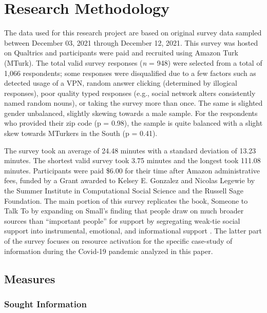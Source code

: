 \hypertarget{research-methodology}{%
\section{Research Methodology}\label{research-methodology}}

The data used for this research project are based on original survey data
sampled between December 03, 2021 through
December 12, 2021. This survey was hosted on Qualtrics and
participants were paid and recruited using Amazon Turk (MTurk). The total valid
survey responses (\emph{n} = 948) were selected from a total of 1,066
respondents; some responses were disqualified due to a few factors such as
detected usage of a VPN, random answer clicking (determined by illogical
responses), poor quality typed responses (e.g., social network alters
consistently named random nouns), or taking the survey more than once. The same
is slighted gender unbalanced, slightly skewing towards a male sample. For the
respondents who provided their zip code (p = 0.98), the sample is quite balanced with a slight skew towards MTurkers in the South (p = 0.41).

The survey took an average of 24.48 minutes with a standard deviation of 13.23 minutes. The shortest valid survey took 3.75 minutes and the longest took 111.08 minutes. Participants were paid \$6.00 for their time after Amazon administrative fees, funded by a Grant awarded to Kelsey E. Gonzalez and Nicolas Legewie by the Summer Institute in Computational Social
Science and the Russell Sage Foundation. The main portion of this survey replicates the book, Someone to Talk To \citep{smallSomeoneTalk2017} by expanding on Small's finding that people draw on much broader sources than ``important people'' for support by segregating weak-tie social support into instrumental, emotional, and informational support \citep[see][]{houseStructuresProcessesSocial1988}. The latter
part of the survey focuses on resource activation for the specific case-study of
information during the Covid-19 pandemic analyzed in this paper.



\hypertarget{measures}{%
\subsection{Measures}\label{measures}}

\hypertarget{sought-information}{%
\subsubsection{Sought Information}\label{sought-information}}

